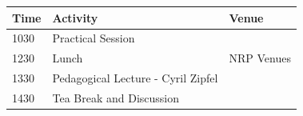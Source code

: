 \documentclass[12pt,]{book}
\theoremstyle{definition}
\theoremstyle{definition}
\theoremstyle{remark}
\begin{document}
\begin{longtable}[]{@{}lll@{}}
\toprule
\begin{minipage}[b]{0.09\columnwidth}\raggedright\strut
Time\strut
\end{minipage} & \begin{minipage}[b]{0.35\columnwidth}\raggedright\strut
Activity\strut
\end{minipage} & \begin{minipage}[b]{0.35\columnwidth}\raggedright\strut
Venue\strut
\end{minipage}\tabularnewline
\midrule
\endhead
\begin{minipage}[t]{0.09\columnwidth}\raggedright\strut
1030\strut
\end{minipage} & \begin{minipage}[t]{0.35\columnwidth}\raggedright\strut
Practical Session\strut
\end{minipage} & \begin{minipage}[t]{0.35\columnwidth}\raggedright\strut
\strut
\end{minipage}\tabularnewline
\begin{minipage}[t]{0.09\columnwidth}\raggedright\strut
1230\strut
\end{minipage} & \begin{minipage}[t]{0.35\columnwidth}\raggedright\strut
Lunch\strut
\end{minipage} & \begin{minipage}[t]{0.35\columnwidth}\raggedright\strut
NRP Venues\strut
\end{minipage}\tabularnewline
\begin{minipage}[t]{0.09\columnwidth}\raggedright\strut
1330\strut
\end{minipage} & \begin{minipage}[t]{0.35\columnwidth}\raggedright\strut
Pedagogical Lecture - Cyril Zipfel\strut
\end{minipage} & \begin{minipage}[t]{0.35\columnwidth}\raggedright\strut
\strut
\end{minipage}\tabularnewline
\begin{minipage}[t]{0.09\columnwidth}\raggedright\strut
1430\strut
\end{minipage} & \begin{minipage}[t]{0.35\columnwidth}\raggedright\strut
Tea Break and Discussion\strut
\end{minipage} & \begin{minipage}[t]{0.35\columnwidth}\raggedright\strut

\end{minipage}
\end{longtable}
\end{document}
